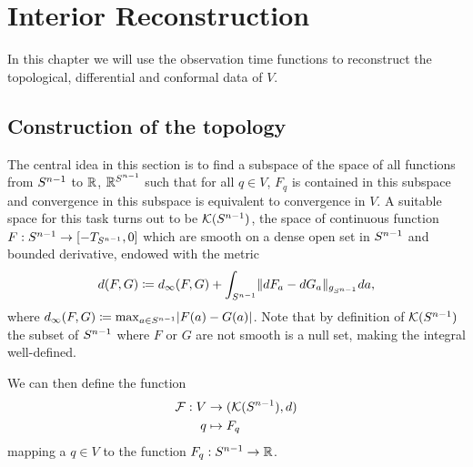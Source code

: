 \chapter{Interior Reconstruction}\label{chap:interior}
In this chapter we will use the observation time functions to reconstruct the topological, differential and conformal data of $V$.

\section{Construction of the topology}
The central idea in this section is to find a subspace of the space of all functions from ${S^{n-1}}$ to $\mathbb{R}$, $\mathbb{R}^{S^{n-1}}$ such that for all $q\in V$, $F_q$ is contained in this subspace and convergence in this subspace is equivalent to convergence in $V$.
A suitable space for this task turns out to be ${\mathcal{K}}({S^{n-1}})$, the space of continuous function $F:{S^{n-1}}\to [-T_{S^{n-1}},0]$ which are smooth on a dense open set in ${S^{n-1}}$ and bounded derivative, endowed with the metric
\[
    d(F,G)\coloneqq  d_\infty(F,G) + \int_{{S^{n-1}}} \lVert dF_a - dG_a \rVert_{g_{S^{n-1}}}da,
\] where $d_\infty(F,G)\coloneqq \max_{a\in {S^{n-1}}}\lvert F(a)-G(a)\rvert$.
Note that by definition of ${\mathcal{K}}({S^{n-1}})$ the subset of ${S^{n-1}}$ where $F$ or $G$ are not smooth is a null set, making the integral well-defined.

We can then define the function 
\begin{align*}
    \mathcal{F}:V &\to ({\mathcal{K}}({S^{n-1}}), d)\\
    q&\mapsto F_q
\end{align*} mapping a $q\in V$ to the function $F_q:{S^{n-1}}\to\mathbb{R}$. 

